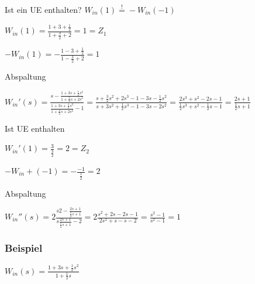 \begin{penumerate}
    \item Ist ein UE enthalten? $W_{in}(1) \overset{!}{=} - W_{in}(-1)$
    \begin{pitemize}
        \item $W_{in}(1) = \frac{1 + 3 + \frac{1}{2}}{1 + \frac{3}{2} + 2} = 1 = Z_1$
        \item $-W_{in}(1) = -\frac{1 - 3 + \frac{1}{2}}{1 - \frac{3}{2} + 2} = 1$
        \item {}
    \end{pitemize}
    \item Abspaltung
    \begin{pitemize}
        \item $W_{in}'(s) = \frac{s - \frac{1 + 3s + \frac{1}{2}s^2}{1 + \frac{3}{2}s + 2 s^2}}{\frac{1 + 3s + \frac{1}{2}s^2}{1 + \frac{3}{2}s + 2 s^2} - 1} = \frac{s + \frac{3}{2}s^2 + 2s^3 - 1 - 3s - \frac{1}{2}s^2}{s + 3s^2 + \frac{1}{2}s^3 -1-3s -2s^2} = \frac{2s^3 + s^2 - 2s - 1}{\frac{1}{2}s^3 + s^2 - \frac{1}{2}s - 1} = \frac{2s + 1}{\frac{1}{2}s + 1}$
    \end{pitemize}
    \item Ist UE enthalten
    \begin{pitemize}
        \item $W_{in}'(1) = \frac{3}{\frac{3}{2}} = 2 = Z_2$
        \item $-W_{in}+(-1) = -\frac{-1}{\frac{1}{2}} = 2$
        \item {}
    \end{pitemize}
    \item Abspaltung
    \begin{pitemize}
        \item $W_{in}''(s) = 2\frac{s2 - \frac{2s + 1}{\frac{1}{2}s + 1}}{s\frac{2s + 1}{\frac{1}{2}s + 1} - 2} = 2\frac{s^2 + 2s - 2s - 1}{2s^2 + s - s - 2} = \frac{s^2 - 1}{s^2 - 1} = 1$
    \end{pitemize}
\end{penumerate}




\subsubsection{Beispiel}

$W_{in}(s) = \frac{1 + 3s + \frac{1}{2}s^2}{1 + \frac{1}{2}s}$

